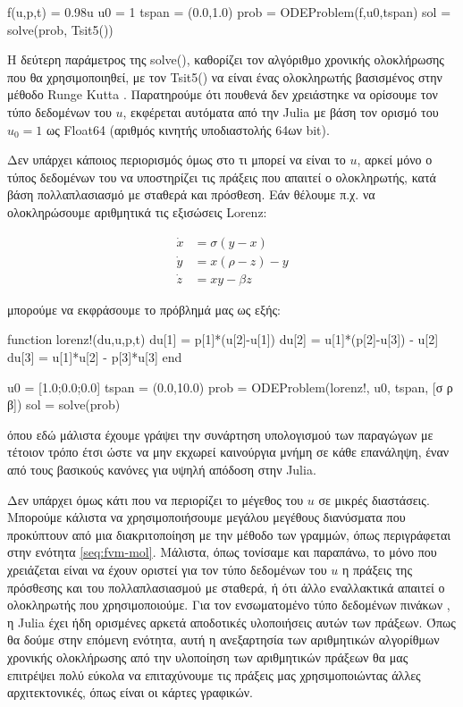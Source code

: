 {\large
\begin{jllisting}[language=julia,style=jlcodestyle]
f(u,p,t) = 0.98u
u0 = 1
tspan = (0.0,1.0)
prob = ODEProblem(f,u0,tspan)
sol = solve(prob, Tsit5())
\end{jllisting}
}

Η δεύτερη παράμετρος της solve(), καθορίζει τον αλγόριθμο χρονικής ολοκλήρωσης που θα χρησιμοποιηθεί, με τον Tsit5() να είναι ένας ολοκληρωτής βασισμένος στην μέθοδο Runge Kutta \cite{Tsitouras2011}.
Παρατηρούμε ότι πουθενά δεν χρειάστηκε να ορίσουμε τον τύπο δεδομένων του $u$, εκφέρεται αυτόματα από την Julia με βάση τον ορισμό του $u_0 = 1$ ως Float64 (αριθμός κινητής υποδιαστολής 64ων bit).

Δεν υπάρχει κάποιος περιορισμός όμως στο τι μπορεί να είναι το $u$, αρκεί μόνο ο τύπος δεδομένων του να υποστηρίζει τις πράξεις που απαιτεί ο ολοκληρωτής, κατά βάση πολλαπλασιασμό με σταθερά και πρόσθεση.
Εάν θέλουμε π.χ. να ολοκληρώσουμε αριθμητικά τις εξισώσεις Lorenz:

\begin{align*}
    \dot{x} &= \sigma (y - x) \\
    \dot{y} &= x(\rho - z) - y \\
    \dot{z} &= x y - \beta z
\end{align*}

μπορούμε να εκφράσουμε το πρόβλημά μας ως εξής:

{\large
\begin{jllisting}[language=julia,style=jlcodestyle]
function lorenz!(du,u,p,t)
    du[1] = p[1]*(u[2]-u[1])
    du[2] = u[1]*(p[2]-u[3]) - u[2]
    du[3] = u[1]*u[2] - p[3]*u[3]
end

u0 = [1.0;0.0;0.0]
tspan = (0.0,10.0)
prob = ODEProblem(lorenz!, u0, tspan, [σ ρ β])
sol = solve(prob)
\end{jllisting}
}

όπου εδώ μάλιστα έχουμε γράψει την συνάρτηση υπολογισμού των παραγώγων με τέτοιον τρόπο έτσι ώστε να μην εκχωρεί καινούργια μνήμη σε κάθε επανάληψη, έναν από τους βασικούς κανόνες για υψηλή απόδοση στην Julia.

Δεν υπάρχει όμως κάτι που να περιορίζει το μέγεθος του $u$ σε μικρές διαστάσεις.
Μπορούμε κάλιστα να χρησιμοποιήσουμε μεγάλου μεγέθους διανύσματα που προκύπτουν από μια διακριτοποίηση με την μέθοδο των γραμμών, όπως περιγράφεται στην ενότητα \ref{seq:fvm-mol}.
Μάλιστα, όπως τονίσαμε και παραπάνω, το μόνο που χρειάζεται είναι να έχουν οριστεί για τον τύπο δεδομένων του $u$ η πράξεις της πρόσθεσης και του πολλαπλασιασμού με σταθερά, ή ότι άλλο εναλλακτικά απαιτεί ο ολοκληρωτής που χρησιμοποιούμε.
Για τον ενσωματομένο τύπο δεδομένων πινάκων , η Julia έχει ήδη ορισμένες αρκετά αποδοτικές υλοποιήσεις αυτών των πράξεων.
Όπως θα δούμε στην επόμενη ενότητα, αυτή η ανεξαρτησία των αριθμητικών αλγορίθμων χρονικής ολοκλήρωσης από την υλοποίηση των αριθμητικών πράξεων θα μας επιτρέψει πολύ εύκολα να επιταχύνουμε τις πράξεις μας χρησιμοποιώντας άλλες αρχιτεκτονικές, όπως είναι οι κάρτες γραφικών.

